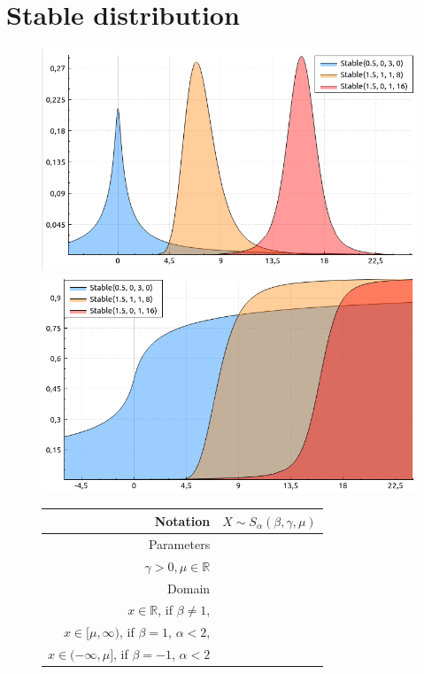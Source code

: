 \documentclass[a4paper,11pt]{article}
\theoremstyle{plain}
\theoremstyle{definition}
\newcommand{\MR}{\mathbb{R}}
\begin{document}
	\section{Stable distribution}
	\begin{figure}[!htb]\centering
		\begin{minipage}{0.55\textwidth}
			\includegraphics[width=\linewidth, right]{stable_pdf}
			\captionsetup{labelformat=empty}
			\includegraphics[width=\linewidth, right]{stable_cdf}
			\captionsetup{labelformat=empty}
		\end{minipage}
		\begin{minipage}{0.4\textwidth}
		\begin{tabular}{| r | l |}
			\hline
			Notation & $X \sim S_\alpha(\beta, \gamma, \mu)$ \\
			\hline
			Parameters & \pbox{\linewidth}{$\alpha \in (0, 2], \beta \in [-1, 1],$\\ $\gamma > 0, \mu \in \MR $} \\
			\hline
			Domain & \pbox{\linewidth}{$ $ \\ $ x \in \MR$, if  $\beta \neq 1$, \\  $ x \in [\mu, \infty)  $, if  $\beta = 1$, $\alpha < 2$, \\ $ x \in (-\infty, \mu]  $, if  $\beta = -1$, $\alpha < 2$}  \\

\end{tabular}
\end{minipage}
\end{figure}
\end{document}
